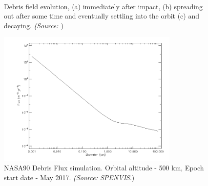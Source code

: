 \begin{figure}[ht!]
  \centering
  \\
  \caption{Debris field evolution, (a) immediately after impact, (b) spreading out after some time and eventually settling into the orbit (c) and decaying. \emph{(Source: \cite{constDesign}})}
  \label{fig:debris}
\end{figure}

\begin{figure}[!h]
\centering
\includegraphics[width=0.8\textwidth, angle=0]{chapters/img/debris.png}
\caption{NASA90 Debris Flux simulation. Orbital altitude - 500 km, Epoch start date - May 2017. \emph{(Source: SPENVIS}.)}
\label{fig:debrisModel}
\end{figure}

